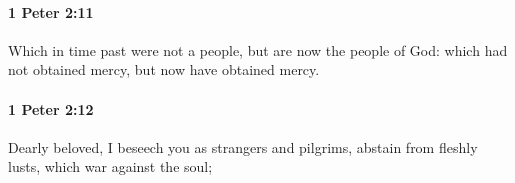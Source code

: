 		\paragraph{1 Peter 2:11} %
			\label{1PETER-2-11}

			Which in time past were not a people, but are now the people of God: which had not obtained mercy, but now have obtained mercy.

			\begin{framed}
			\scriptsize
				\begin{compactdesc}
					\item[SBLG] 
				\end{compactdesc}
			\end{framed}

		\paragraph{1 Peter 2:12} %
			\label{1PETER-2-12}

			Dearly beloved, I beseech you as strangers and pilgrims, abstain from fleshly lusts, which war against the soul;

